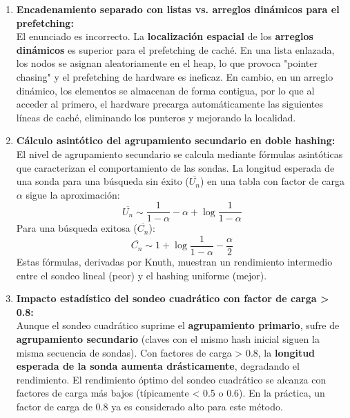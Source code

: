 \documentclass[12pt,a4paper]{report}
\begin{document}
\begin{enumerate}
    El acceso cross-socket no acelera el rendimiento en un sistema NUMA bien diseñado; de hecho, suele ser más costoso. Los sistemas NUMA optimizan el rendimiento \textbf{minimizando} los accesos remotos. La técnica de "balanceo de carga" se logra mediante una \textbf{ubicación consciente de NUMA}, donde los datos se colocan en la memoria local del socket que los usa más frecuentemente. Algoritmos como ALPHA usan delegación cross-thread y estructuras particionadas para reducir el impacto de accesos remotos, evitando así que estos se conviertan en el cuello de botella.
    \item \textbf{Encadenamiento separado con listas vs. arreglos dinámicos para el prefetching:}\\
    El enunciado es incorrecto. La \textbf{localización espacial} de los \textbf{arreglos dinámicos} es superior para el prefetching de caché. En una lista enlazada, los nodos se asignan aleatoriamente en el heap, lo que provoca "pointer chasing" y el prefetching de hardware es ineficaz. En cambio, en un arreglo dinámico, los elementos se almacenan de forma contigua, por lo que al acceder al primero, el hardware precarga automáticamente las siguientes líneas de caché, eliminando los punteros y mejorando la localidad.
    \item \textbf{Cálculo asintótico del agrupamiento secundario en doble hashing:}\\
    El nivel de agrupamiento secundario se calcula mediante fórmulas asintóticas que caracterizan el comportamiento de las sondas. La longitud esperada de una sonda para una búsqueda sin éxito ($\overline{U_{n}}$) en una tabla con factor de carga $\alpha$ sigue la aproximación:
    \[ \overline{U_{n}} \sim \frac{1}{1 - \alpha} -\alpha +\log \frac{1}{1 - \alpha} \]
    Para una búsqueda exitosa ($\overline{C_{n}}$):
    \[ \overline{C_{n}} \sim 1 + \log \frac{1}{1 - \alpha} -\frac{\alpha}{2} \]
    Estas fórmulas, derivadas por Knuth, muestran un rendimiento intermedio entre el sondeo lineal (peor) y el hashing uniforme (mejor).
    \item \textbf{Impacto estadístico del sondeo cuadrático con factor de carga > 0.8:}\\
    Aunque el sondeo cuadrático suprime el \textbf{agrupamiento primario}, sufre de \textbf{agrupamiento secundario} (claves con el mismo hash inicial siguen la misma secuencia de sondas). Con factores de carga > 0.8, la \textbf{longitud esperada de la sonda aumenta drásticamente}, degradando el rendimiento. El rendimiento óptimo del sondeo cuadrático se alcanza con factores de carga más bajos (típicamente < 0.5 o 0.6). En la práctica, un factor de carga de 0.8 ya es considerado alto para este método.

\end{enumerate}
\end{document}
